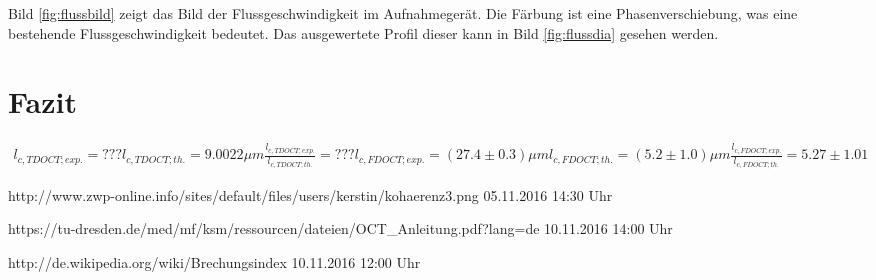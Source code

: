 \documentclass[german, %
parskip=full, %
bibliography=totoc, %
]{scrartcl}
\begin{document}
Bild \ref{fig:flussbild} zeigt das Bild der Flussgeschwindigkeit im Aufnahmegerät. Die Färbung ist eine Phasenverschiebung, was eine bestehende Flussgeschwindigkeit bedeutet. Das ausgewertete Profil dieser kann in Bild \ref{fig:flussdia} gesehen werden.

\section{Fazit}

\begin{align*}
l_{c, TD OCT; exp.} = ???
l_{c, TD OCT; th.} = 9.0022 \mu m
\frac{l_{c, TD OCT; exp.}}{l_{c, TD OCT; th.}} = ???
l_{c, FD OCT; exp.} = (27.4 \pm 0.3) \mu m
l_{c, FD OCT; th.} = (5.2 \pm 1.0) \mu m
\frac{l_{c, FD OCT; exp.}}{l_{c, FD OCT; th.}} = 5.27 \pm 1.01
\end{align*}




\begin{thebibliography}{9}

  http://www.zwp-online.info/sites/default/files/users/kerstin/kohaerenz3.png
	05.11.2016
	14:30 Uhr

  https://tu-dresden.de/med/mf/ksm/ressourcen/dateien/OCT\_Anleitung.pdf?lang=de
	10.11.2016
	14:00 Uhr

  http://de.wikipedia.org/wiki/Brechungsindex
	10.11.2016
	12:00 Uhr

\end{thebibliography}
\end{document}

